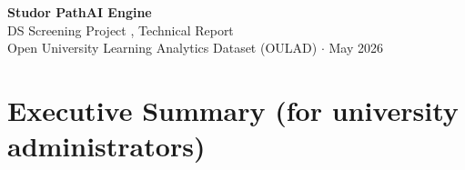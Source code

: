 \documentclass[10pt,a4paper]{article}
\begin{document}

\begin{center}
  {\LARGE\bfseries\color{sectionblue} Studor PathAI Engine}\\[4pt]
  {\large\color{studorred} DS Screening Project , Technical Report}\\[2pt]
  {\small\color{darkgray} Open University Learning Analytics Dataset (OULAD) $\cdot$ May 2026}
\end{center}

\vspace{6pt}

\section{Executive Summary \textnormal{\small(for university administrators)}}
\end{document}
